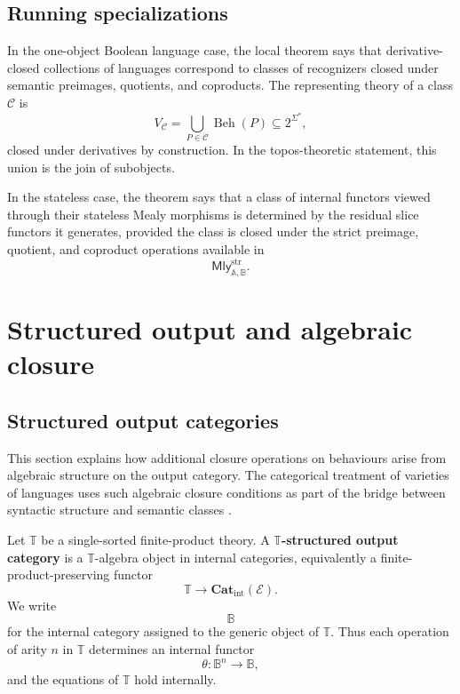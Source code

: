 \subsection{Running specializations}
\label{subsec:local-birkhoff-running-specializations}

In the one-object Boolean language case, the local theorem says that
derivative-closed collections of languages correspond to classes of recognizers
closed under semantic preimages, quotients, and coproducts. The representing
theory of a class \(\mathcal C\) is
\[
    V_{\mathcal C}
    =
    \bigcup_{P\in\mathcal C}\operatorname{Beh}(P)
    \subseteq
    2^{\Sigma^*},
\]
closed under derivatives by construction. In the topos-theoretic statement,
this union is the join of subobjects.

In the stateless case, the theorem says that a class of internal functors
viewed through their stateless Mealy morphisms is determined by the residual
slice functors it generates, provided the class is closed under the strict
preimage, quotient, and coproduct operations available in
\[
    \mathsf{Mly}^{\mathrm{str}}_{\mathbb A,\mathbb B}.
\]

\section{Structured output and algebraic closure}
\label{sec:structured-output-algebraic-closure}

\subsection{Structured output categories}
\label{subsec:structured-output-categories}

This section explains how additional closure operations on behaviours arise
from algebraic structure on the output category. The categorical treatment of
varieties of languages uses such algebraic closure conditions as part of the
bridge between syntactic structure and semantic classes
\cite{Eilenberg1974,AdamekMiliusMyersUrbat2019TOCL,Salamanca2016Monad}.

\begin{definition}
\label{def:structured-output-category}
    Let \(\mathbb T\) be a single-sorted finite-product theory. A
    \textbf{\(\mathbb T\)-structured output category} is a \(\mathbb T\)-algebra
    object in internal categories, equivalently a finite-product-preserving
    functor
    \[
        \mathbb T\longrightarrow \mathbf{Cat}_{\mathrm{int}}(\mathcal E).
    \]
    We write
    \[
        \mathbb B
    \]
    for the internal category assigned to the generic object of \(\mathbb T\).
    Thus each operation of arity \(n\) in \(\mathbb T\) determines an internal
    functor
    \[
        \theta:\mathbb B^n\to\mathbb B,
    \]
    and the equations of \(\mathbb T\) hold internally.
\end{definition}

